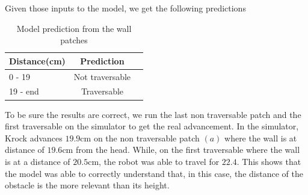 \documentclass[../document.tex]{subfiles}
\begin{document}
Given those inputs to the model, we get the following predictions

\begin{table}[H]
    \centering
    \begin{tabular}{l|cc}
        Distance(cm) & Prediction \\ 
        \hline
        0 - 19  & Not traversable \\ 
        19 - end & Traversable \\ 
        \hline
    \end{tabular}
    \caption{Model prediction from the wall patches}
\end{table}
To be sure the results are correct, we run the last non traversable patch and the first traversable
on the simulator to get the real advancement. In the simulator, Krock advances $19.9$cm on the non traversable patch $(a)$ where the wall is at distance of $19.6$cm from the head. While, on the first traversable where the wall is at a distance of $20.5$cm, the robot was able to travel for $22.4$. This shows that the model was able to correctly understand that, in this case, the distance of the obstacle is the more relevant than its height.
\end{document}
